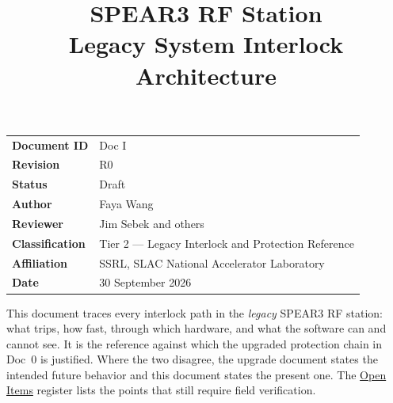 \documentclass[letterpaper,11pt]{article}
\title{\vspace{-1.4cm}\bfseries SPEAR3 RF Station\\[2mm]
       \Large Legacy System Interlock Architecture}
\author{}
\date{}
\begin{document}
\maketitle
\thispagestyle{plain}

\begin{center}
\begin{minipage}{0.86\linewidth}\small
\begin{tabular}{@{}ll@{}}
\textbf{Document ID} & Doc I \\
\textbf{Revision}    & R0 \\
\textbf{Status}      & Draft \\
\textbf{Author}      & Faya Wang \\
\textbf{Reviewer}    & Jim Sebek and others \\
\textbf{Classification} & Tier 2 --- Legacy Interlock and Protection Reference \\
\textbf{Affiliation} & SSRL, SLAC National Accelerator Laboratory \\
\textbf{Date}        & 30 September 2026 \\
\end{tabular}
\end{minipage}
\end{center}

\vspace{4mm}
\begin{keynote}
This document traces every interlock path in the \emph{legacy} SPEAR3 RF station:
what trips, how fast, through which hardware, and what the software can and
cannot see. It is the reference against which the upgraded protection chain in
Doc~0 is justified. Where the two disagree, the upgrade document states the
intended future behavior and this document states the present one. The
\hyperref[sec:open-items]{Open Items} register lists the points that still
require field verification.
\end{keynote}

\clearpage
\tableofcontents
\clearpage
\listoffigures
\clearpage


\end{document}
